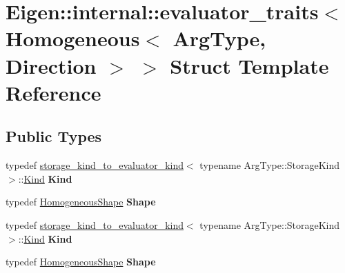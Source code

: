\hypertarget{struct_eigen_1_1internal_1_1evaluator__traits_3_01_homogeneous_3_01_arg_type_00_01_direction_01_4_01_4}{}\section{Eigen\+:\+:internal\+:\+:evaluator\+\_\+traits$<$ Homogeneous$<$ Arg\+Type, Direction $>$ $>$ Struct Template Reference}
\label{struct_eigen_1_1internal_1_1evaluator__traits_3_01_homogeneous_3_01_arg_type_00_01_direction_01_4_01_4}
\subsection*{Public Types}
\begin{DoxyCompactItemize}
\item 
\mbox{\label{struct_eigen_1_1internal_1_1evaluator__traits_3_01_homogeneous_3_01_arg_type_00_01_direction_01_4_01_4_aac836b3f5b97f29042d9cf140b3617dc}} 
typedef \hyperlink{struct_eigen_1_1internal_1_1storage__kind__to__evaluator__kind}{storage\+\_\+kind\+\_\+to\+\_\+evaluator\+\_\+kind}$<$ typename Arg\+Type\+::\+Storage\+Kind $>$\+::\hyperlink{struct_eigen_1_1internal_1_1_index_based}{Kind} {\bfseries Kind}
\item 
\mbox{\label{struct_eigen_1_1internal_1_1evaluator__traits_3_01_homogeneous_3_01_arg_type_00_01_direction_01_4_01_4_ac8979d16a4c8219f556330711e3204a8}} 
typedef \hyperlink{struct_eigen_1_1_homogeneous_shape}{Homogeneous\+Shape} {\bfseries Shape}
\item 
\mbox{\label{struct_eigen_1_1internal_1_1evaluator__traits_3_01_homogeneous_3_01_arg_type_00_01_direction_01_4_01_4_aac836b3f5b97f29042d9cf140b3617dc}} 
typedef \hyperlink{struct_eigen_1_1internal_1_1storage__kind__to__evaluator__kind}{storage\+\_\+kind\+\_\+to\+\_\+evaluator\+\_\+kind}$<$ typename Arg\+Type\+::\+Storage\+Kind $>$\+::\hyperlink{struct_eigen_1_1internal_1_1_index_based}{Kind} {\bfseries Kind}
\item 
\mbox{\label{struct_eigen_1_1internal_1_1evaluator__traits_3_01_homogeneous_3_01_arg_type_00_01_direction_01_4_01_4_ac8979d16a4c8219f556330711e3204a8}} 
typedef \hyperlink{struct_eigen_1_1_homogeneous_shape}{Homogeneous\+Shape} {\bfseries Shape}
\end{DoxyCompactItemize}


